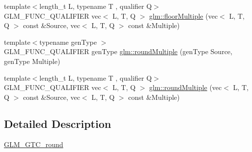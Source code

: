 \begin{DoxyCompactItemize}
{\footnotesize template$<$length\+\_\+t L, typename T , qualifier Q$>$ }\\G\+L\+M\+\_\+\+F\+U\+N\+C\+\_\+\+Q\+U\+A\+L\+I\+F\+I\+ER vec$<$ L, T, Q $>$ \hyperlink{group__gtc__round_gacdd8901448f51f0b192380e422fae3e4}{glm\+::floor\+Multiple} (vec$<$ L, T, Q $>$ const \&Source, vec$<$ L, T, Q $>$ const \&Multiple)
\item 
{\footnotesize template$<$typename gen\+Type $>$ }\\G\+L\+M\+\_\+\+F\+U\+N\+C\+\_\+\+Q\+U\+A\+L\+I\+F\+I\+ER gen\+Type \hyperlink{group__gtc__round_gab892defcc9c0b0618df7251253dc0fbb}{glm\+::round\+Multiple} (gen\+Type Source, gen\+Type Multiple)
\item 
{\footnotesize template$<$length\+\_\+t L, typename T , qualifier Q$>$ }\\G\+L\+M\+\_\+\+F\+U\+N\+C\+\_\+\+Q\+U\+A\+L\+I\+F\+I\+ER vec$<$ L, T, Q $>$ \hyperlink{group__gtc__round_ga2f1a68332d761804c054460a612e3a4b}{glm\+::round\+Multiple} (vec$<$ L, T, Q $>$ const \&Source, vec$<$ L, T, Q $>$ const \&Multiple)
\end{DoxyCompactItemize}


\subsection{Detailed Description}
\hyperlink{group__gtc__round}{G\+L\+M\+\_\+\+G\+T\+C\+\_\+round} 